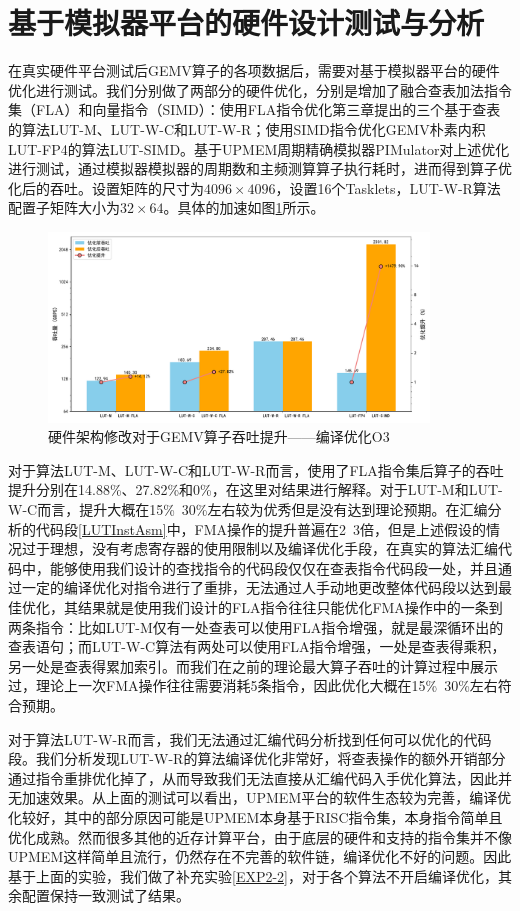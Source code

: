 \section{基于模拟器平台的硬件设计测试与分析}
在真实硬件平台测试后GEMV算子的各项数据后，需要对基于模拟器平台的硬件优化进行测试。我们分别做了两部分的硬件优化，分别是增加了融合查表加法指令集（FLA）和向量指令（SIMD）：使用FLA指令优化第三章提出的三个基于查表的算法LUT-M、LUT-W-C和LUT-W-R；使用SIMD指令优化GEMV朴素内积LUT-FP4的算法LUT-SIMD。基于UPMEM周期精确模拟器PIMulator对上述优化进行测试，通过模拟器模拟器的周期数和主频测算算子执行耗时，进而得到算子优化后的吞吐。设置矩阵的尺寸为$4096\times 4096$，设置16个Tasklets，LUT-W-R算法配置子矩阵大小为$32\times 64$。具体的加速如图\ref{EXP2-1}所示。

\begin{figure}[!htbp]
    \centering
    \includegraphics[width=0.9\textwidth]{figures/Exp2-1.pdf}
    \caption{硬件架构修改对于GEMV算子吞吐提升——编译优化O3}
	\label{EXP2-1}
\end{figure}

对于算法LUT-M、LUT-W-C和LUT-W-R而言，使用了FLA指令集后算子的吞吐提升分别在14.88\%、27.82\%和0\%，在这里对结果进行解释。对于LUT-M和LUT-W-C而言，提升大概在15\%~30\%左右较为优秀但是没有达到理论预期。在汇编分析的代码段\ref{LUTInstAsm}中，FMA操作的提升普遍在2~3倍，但是上述假设的情况过于理想，没有考虑寄存器的使用限制以及编译优化手段，在真实的算法汇编代码中，能够使用我们设计的查找指令的代码段仅仅在查表指令代码段一处，并且通过一定的编译优化对指令进行了重排，无法通过人手动地更改整体代码段以达到最佳优化，其结果就是使用我们设计的FLA指令往往只能优化FMA操作中的一条到两条指令：比如LUT-M仅有一处查表可以使用FLA指令增强，就是最深循环出的查表语句；而LUT-W-C算法有两处可以使用FLA指令增强，一处是查表得乘积，另一处是查表得累加索引。而我们在之前的理论最大算子吞吐的计算过程中展示过，理论上一次FMA操作往往需要消耗5条指令，因此优化大概在15\%~30\%左右符合预期。

对于算法LUT-W-R而言，我们无法通过汇编代码分析找到任何可以优化的代码段。我们分析发现LUT-W-R的算法编译优化非常好，将查表操作的额外开销部分通过指令重排优化掉了，从而导致我们无法直接从汇编代码入手优化算法，因此并无加速效果。从上面的测试可以看出，UPMEM平台的软件生态较为完善，编译优化较好，其中的部分原因可能是UPMEM本身基于RISC指令集，本身指令简单且优化成熟。然而很多其他的近存计算平台，由于底层的硬件和支持的指令集并不像UPMEM这样简单且流行，仍然存在不完善的软件链，编译优化不好的问题。因此基于上面的实验，我们做了补充实验\ref{EXP2-2}，对于各个算法不开启编译优化，其余配置保持一致测试了结果。

